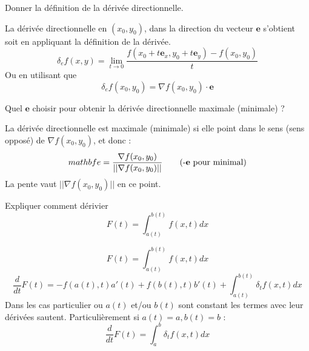 \documentclass[12pt]{article}
\newcommand*{\xfield}[1]{\begin{mdframed}\centering #1\end{mdframed}\bigskip}
\newenvironment{note}{}{}
\begin{document}
\begin{note}
\xfield{Donner la définition de la dérivée directionnelle.}
\xfield{La dérivée directionnelle en $(x_0,y_0)$, dans la direction du vecteur $\mathbf{e}$ s'obtient soit en appliquant la définition de la dérivée. 
$$\delta_e f(x,y) = \lim_{t \to 0} \frac{f(x_0+t\mathbf{e}_x,y_0 + t\mathbf{e}_y) - f(x_0,y_0)}{t}$$
Ou en utilisant que
$$\delta_e f(x_0,y_0) = \nabla f(x_0,y_0) \cdot \mathbf{e}$$ }
\end{note}

\begin{note}
\xfield{Quel $\mathbf{e}$ choisir pour obtenir la dérivée directionnelle maximale (minimale) ?}
\xfield{La dérivée directionnelle est maximale (minimale) si elle point dans le sens (sens opposé) de $\nabla f(x_0,y_0)$, et donc :
\begin{align*}
mathbf{e} = \frac{\nabla f(x_0,y_0)}{\vert \vert \nabla f(x_0,y_0) \vert \vert} \tag*{(-$\mathbf{e}$ pour minimal)}
\end{align*}La pente vaut $\vert \vert \nabla f(x_0,y_0) \vert \vert$ en ce point. }
\end{note}
\begin{note}
\xfield{Expliquer comment dérivier $$F(t) = \int_{a(t)}^{b(t)} f(x,t)dx $$}
\xfield{$$F(t) = \int_{a(t)}^{b(t)} f(x,t)dx $$
$$\frac{d}{dt} F(t) = -f(a(t),t)a'(t) + f(b(t),t)b'(t) + \int_{a(t)}^{b(t)} \delta _t f(x,t) dx$$
Dans les cas particulier ou $a(t)$ et/ou $b(t)$ sont constant les termes avec leur dérivées sautent. Particulièrement si $a(t) = a, b(t) = b$ :
$$\frac{d}{dt} F(t) = \int_a^b \delta_t f(x,t)dx$$}
\end{note}
\end{document}
